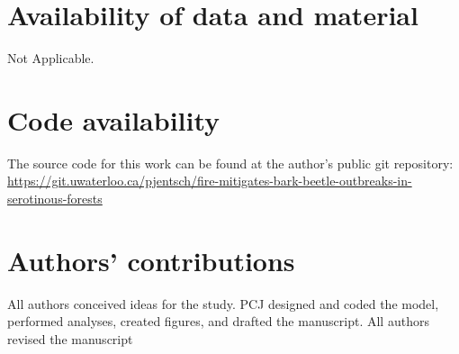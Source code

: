 \section*{Availability of data and material}

Not Applicable.

\section*{Code availability}

The source code for this work can be found at the author's public git repository: \url{https://git.uwaterloo.ca/pjentsch/fire-mitigates-bark-beetle-outbreaks-in-serotinous-forests}


\section*{Authors' contributions}
All authors conceived ideas for the study. PCJ designed and coded the model, performed analyses, created figures, and drafted the manuscript. All authors revised the manuscript

